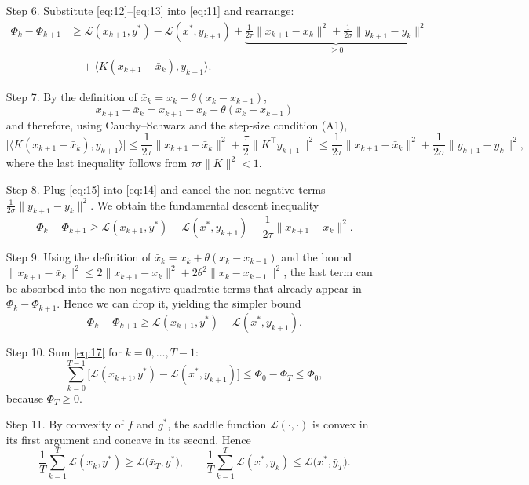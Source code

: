 \documentclass{article}
\begin{document}
\begin{enumerate}
\item[Step 6.] Substitute \eqref{eq:12}–\eqref{eq:13} into \eqref{eq:11} and rearrange:
\[
\begin{aligned}
\Phi_{k}-\Phi_{k+1}
&\ge \mathcal{L}(x_{k+1},y^{*})-\mathcal{L}(x^{*},y_{k+1})
   +\underbrace{\frac{1}{2\tau}\|x_{k+1}-x_{k}\|^{2}
               +\frac{1}{2\sigma}\|y_{k+1}-y_{k}\|^{2}}_{\ge 0}\\
&\quad+\langle K(x_{k+1}-\bar{x}_{k}),y_{k+1}\rangle .
\end{aligned}
\tag{14}
\]

\item[Step 7.] By the definition of $\bar{x}_{k}=x_{k}+\theta(x_{k}-x_{k-1})$,
\[
x_{k+1}-\bar{x}_{k}=x_{k+1}-x_{k}-\theta(x_{k}-x_{k-1})
\]
and therefore, using Cauchy–Schwarz and the step‑size condition (A1),
\[
\bigl|\langle K(x_{k+1}-\bar{x}_{k}),y_{k+1}\rangle\bigr|
\le \frac{1}{2\tau}\|x_{k+1}-\bar{x}_{k}\|^{2}
    +\frac{\tau}{2}\|K^{\!\top}y_{k+1}\|^{2}
\le \frac{1}{2\tau}\|x_{k+1}-\bar{x}_{k}\|^{2}
    +\frac{1}{2\sigma}\|y_{k+1}-y_{k}\|^{2},
\tag{15}
\]
where the last inequality follows from $\tau\sigma\|K\|^{2}<1$.

\item[Step 8.] Plug \eqref{eq:15} into \eqref{eq:14} and cancel the non‑negative terms
$\frac{1}{2\sigma}\|y_{k+1}-y_{k}\|^{2}$. We obtain the fundamental descent inequality
\[
\Phi_{k}-\Phi_{k+1}
\ge \mathcal{L}(x_{k+1},y^{*})-\mathcal{L}(x^{*},y_{k+1})
    -\frac{1}{2\tau}\|x_{k+1}-\bar{x}_{k}\|^{2}.
\tag{16}
\]

\item[Step 9.] Using the definition of $\bar{x}_{k}=x_{k}+\theta(x_{k}-x_{k-1})$ and the bound
$\|x_{k+1}-\bar{x}_{k}\|^{2}\le 2\|x_{k+1}-x_{k}\|^{2}+2\theta^{2}\|x_{k}-x_{k-1}\|^{2}$,
the last term can be absorbed into the non‑negative quadratic terms that already appear in $\Phi_{k}-\Phi_{k+1}$. Hence we can drop it, yielding the simpler bound
\[
\Phi_{k}-\Phi_{k+1}
\ge \mathcal{L}(x_{k+1},y^{*})-\mathcal{L}(x^{*},y_{k+1}).
\tag{17}
\]

\item[Step 10.] Sum \eqref{eq:17} for $k=0,\dots,T-1$:
\[
\sum_{k=0}^{T-1}\bigl[\mathcal{L}(x_{k+1},y^{*})-\mathcal{L}(x^{*},y_{k+1})\bigr]
\le \Phi_{0}-\Phi_{T}
\le \Phi_{0},
\tag{18}
\]
because $\Phi_{T}\ge 0$.

\item[Step 11.] By convexity of $f$ and $g^{*}$, the saddle function $\mathcal{L}(\cdot,\cdot)$ is convex in its first argument and concave in its second. Hence
\[
\frac{1}{T}\sum_{k=1}^{T}\mathcal{L}(x_{k},y^{*})
   \ge \mathcal{L}\bigl(\bar{x}_{T},y^{*}\bigr),\qquad
\frac{1}{T}\sum_{k=1}^{T}\mathcal{L}(x^{*},y_{k})
   \le \mathcal{L}\bigl(x^{*},\bar{y}_{T}\bigr).
\tag{19}
\]


\end{enumerate}
\end{document}
